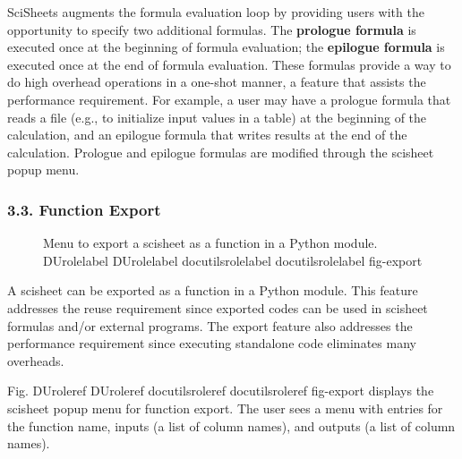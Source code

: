 \documentclass[letterpaper,compsoc,twoside]{IEEEtran}
\providecommand*{\DUrole}[2]{%
  \ifcsname DUrole#1\endcsname%
    \csname DUrole#1\endcsname{#2}%
  \else%
    \ifcsname docutilsrole#1\endcsname%
      \csname docutilsrole#1\endcsname{#2}%
    \else%
      #2%
    \fi%
  \fi%
}
\begin{document}
SciSheets augments the formula evaluation loop by providing users with the opportunity
to specify two additional formulas.
The \textbf{prologue formula} is executed once at the beginning of formula evaluation;
the \textbf{epilogue formula} is executed once at the end of formula evaluation.
These formulas provide a way to do high overhead operations in a one-shot manner,
a feature
that assists the performance requirement.
For example, a user may have a prologue formula that
reads a file (e.g., to initialize input values in a table) at the beginning
of the calculation, and an epilogue formula
that writes results at the end of the calculation.
Prologue and epilogue formulas are modified through the scisheet popup menu.

\subsubsection{3.3. Function Export%
  \label{function-export}%
}
\begin{figure}[]\noindent{}
\caption{Menu to export a scisheet as a
function in a Python module.
\DUrole{label}{fig-export}}
\end{figure}

A scisheet can be exported as
a function in a Python module.
This feature addresses the reuse requirement since
exported codes can be used in scisheet formulas
and/or external programs.
The export feature also addresses the performance requirement
since executing standalone code eliminates
many overheads.

Fig. \DUrole{ref}{fig-export} displays the scisheet popup menu for
function export.
The user sees a menu with entries for the function name,
inputs (a list of column names),
and outputs (a list of column names).
\end{document}
